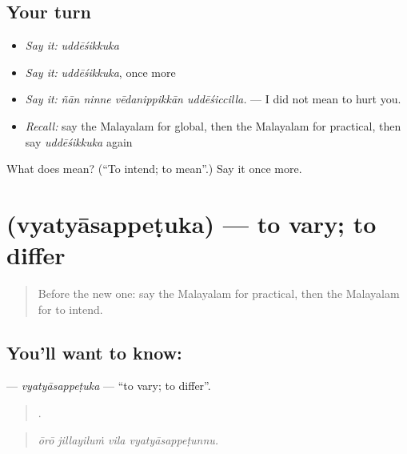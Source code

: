 \subsection*{Your turn}
\begin{itemize}
\raggedright
  \item \emph{Say it:} \emph{uddēśikkuka}
  \item \emph{Say it:} \emph{uddēśikkuka}, once more
  \item \emph{Say it:} \emph{ñān ninne vēdanippikkān uddēśiccilla.} — I did not mean to hurt you.
  \item \emph{Recall:} say the Malayalam for global, then the Malayalam for practical, then say \emph{uddēśikkuka} again
\end{itemize}

\begin{tcolorbox}[breakable,colback=teal!4,colframe=teal!35!black,title={Before you move on}]
What does  mean? (\textquotedblleft{}To intend; to mean\textquotedblright{}.) Say it once more.
\end{tcolorbox}
\section[\texorpdfstring{\ml{വ്യത്യാസപ്പെടുക} (vyatyāsappeṭuka)}{വ്യത്യാസപ്പെടുക (vyatyāsappeṭuka)}]{ (vyatyāsappeṭuka) — to vary; to differ}

\label{lesson:ML-C460-vyatyasappetuka}



\begin{quote}
Before the new one: say the Malayalam for practical, then the Malayalam for to intend.
\end{quote}

\subsection*{You'll want to know: }
\textbf{} — \emph{vyatyāsappeṭuka} — \textquotedblleft{}to vary; to differ\textquotedblright{}.

\begin{quote}
   .
\end{quote}

\begin{quote}
\emph{ōrō jillayiluṁ vila vyatyāsappeṭunnu.}
\end{quote}

